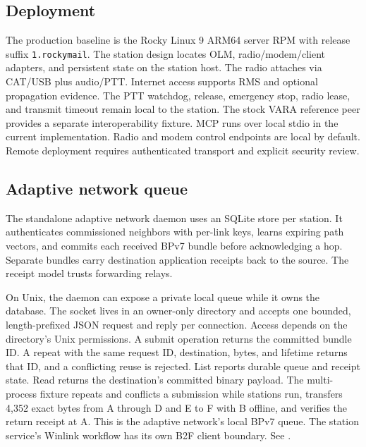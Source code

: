 \documentclass[11pt,a4paper]{article}
\begin{document}
\subsection{Deployment}
The production baseline is the Rocky Linux 9 ARM64 server RPM with release
suffix \texttt{1.rockymail}. The station
design locates OLM, radio/modem/client adapters, and persistent state on the
station host. The radio attaches via CAT/USB plus audio/PTT. Internet access
supports RMS and optional propagation evidence. The PTT watchdog, release,
emergency stop, radio lease, and transmit timeout remain local to the station.
The stock VARA reference peer provides a separate interoperability fixture.
MCP runs over local stdio in the current implementation. Radio and modem
control endpoints are local by default. Remote deployment requires
authenticated transport and explicit security review.

\subsection{Adaptive network queue}
\label{sec:adaptive-network-queue}
The standalone adaptive network daemon uses an SQLite store per station.
It authenticates commissioned neighbors with per-link keys, learns expiring
path vectors, and commits each received BPv7 bundle before acknowledging a
hop. Separate bundles carry destination application receipts back to the
source. The receipt model trusts forwarding relays.

On Unix, the daemon can expose a private local queue while it owns the
database. The socket lives in an owner-only directory and accepts one
bounded, length-prefixed JSON request and reply per connection. Access
depends on the directory's Unix permissions. A submit operation returns
the committed bundle ID. A repeat
with the same request ID, destination, bytes, and lifetime returns that ID,
and a conflicting reuse is rejected. List reports durable queue and receipt
state. Read returns the destination's committed binary payload. The
multi-process fixture repeats and conflicts a submission while stations
run, transfers 4,352 exact bytes from A through D and E to F with B
offline, and verifies the return receipt at A.
This is the adaptive network's local BPv7 queue. The station service's
Winlink workflow has its own B2F client boundary. See
.
\end{document}
